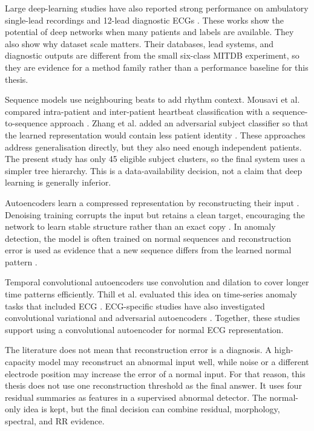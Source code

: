 Large deep-learning studies have also reported strong performance on ambulatory
single-lead recordings and 12-lead diagnostic ECGs
\cite{hannun2019cardiologist,ribeiro2020ecg}. These works show the potential of
deep networks when many patients and labels are available. They also show why
dataset scale matters. Their databases, lead systems, and diagnostic outputs are
different from the small six-class MITDB experiment, so they are evidence for a
method family rather than a performance baseline for this thesis.

Sequence models use neighbouring beats to add rhythm context. Mousavi et al.
compared intra-patient and inter-patient heartbeat classification with a
sequence-to-sequence approach \cite{mousavi2019seq2seq}. Zhang et al. added an
adversarial subject classifier so that the learned representation would contain
less patient identity \cite{zhang2021interpatient}. These approaches address
generalisation directly, but they also need enough independent patients. The
present study has only 45 eligible subject clusters, so the final system uses a
simpler tree hierarchy. This is a data-availability decision, not a claim that
deep learning is generally inferior.

Autoencoders learn a compressed representation by reconstructing their input
\cite{hinton2006autoencoder}. Denoising training corrupts the input but retains a
clean target, encouraging the network to learn stable structure rather than an
exact copy \cite{vincent2008denoising}. In anomaly detection, the model is often
trained on normal sequences and reconstruction error is used as evidence that a
new sequence differs from the learned normal pattern
\cite{chandola2009anomaly,malhotra2016lstm}.

Temporal convolutional autoencoders use convolution and dilation to cover longer
time patterns efficiently. Thill et al. evaluated this idea on time-series
anomaly tasks that included ECG \cite{thill2021tcnae}. ECG-specific studies have
also investigated convolutional variational and adversarial autoencoders
\cite{jang2021cvae,zhou2022aae}. Together, these studies support using a
convolutional autoencoder for normal ECG representation.

The literature does not mean that reconstruction error is a diagnosis. A
high-capacity model may reconstruct an abnormal input well, while noise or a
different electrode position may increase the error of a normal input. For that
reason, this thesis does not use one reconstruction threshold as the final
answer. It uses four residual summaries as features in a supervised abnormal
detector. The normal-only idea is kept, but the final decision can combine
residual, morphology, spectral, and RR evidence.

